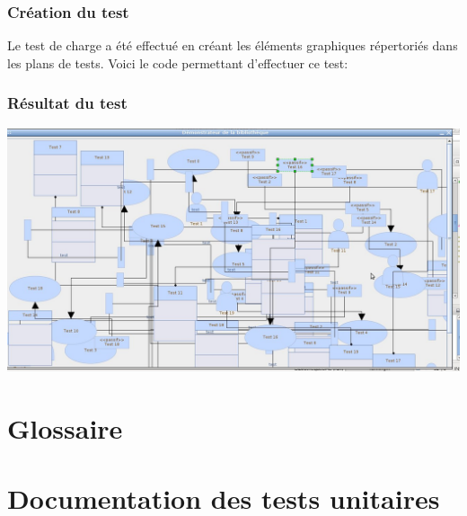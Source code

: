 \documentclass[12pt,a4paper,openany]{report}
\begin{document}
	\subsection{Création du test}
	Le test de charge a été effectué en créant les éléments graphiques répertoriés dans les plans de tests. Voici le code permettant d'effectuer ce test:
	
	\subsection{Résultat du test}
	\includegraphics[width=25cm, angle=90]{testCharge.jpg}
	\closeout\glossaireVar
	\appendix	
	\chapter{Glossaire} \label{glossaire}
	\begin{sortedlist}
		
	\end{sortedlist}

	\chapter{Documentation des tests unitaires}
	\label{junitdoc}
	
\end{document}
